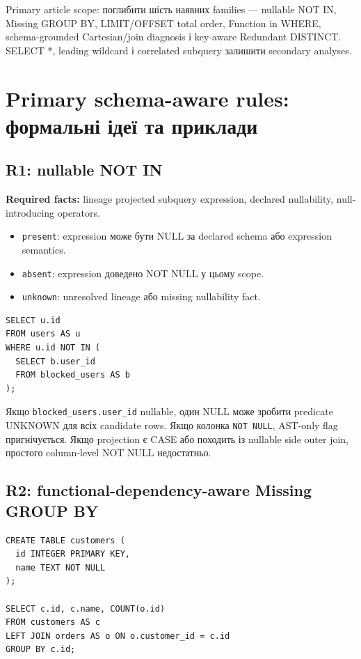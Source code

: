 \documentclass[11pt,a4paper]{article}
\newcommand{\unknown}{\texttt{unknown}}
\newcommand{\presentstate}{\texttt{present}}
\newcommand{\absentstate}{\texttt{absent}}
\begin{document}
\begin{mustbox}
Primary article scope: поглибити шість наявних families --- nullable NOT IN,
Missing GROUP BY, LIMIT/OFFSET total order, Function in WHERE, schema-grounded
Cartesian/join diagnosis і key-aware Redundant DISTINCT. SELECT *, leading wildcard
і correlated subquery залишити secondary analyses.
\end{mustbox}

\section{Primary schema-aware rules: формальні ідеї та приклади}

\subsection{R1: nullable NOT IN}

\textbf{Required facts:} lineage projected subquery expression, declared nullability,
null-introducing operators.

\begin{itemize}
\item \presentstate: expression може бути NULL за declared schema або expression
      semantics.
\item \absentstate: expression доведено NOT NULL у цьому scope.
\item \unknown: unresolved lineage або missing nullability fact.
\end{itemize}

\begin{lstlisting}[style=sqlstyle]
SELECT u.id
FROM users AS u
WHERE u.id NOT IN (
  SELECT b.user_id
  FROM blocked_users AS b
);
\end{lstlisting}

Якщо \texttt{blocked\_users.user\_id} nullable, один NULL може зробити predicate
UNKNOWN для всіх candidate rows. Якщо колонка \texttt{NOT NULL}, AST-only flag
пригнічується. Якщо projection є CASE або походить із nullable side outer join,
простого column-level NOT NULL недостатньо.

\subsection{R2: functional-dependency-aware Missing GROUP BY}

\begin{lstlisting}[style=sqlstyle]
CREATE TABLE customers (
  id INTEGER PRIMARY KEY,
  name TEXT NOT NULL
);

SELECT c.id, c.name, COUNT(o.id)
FROM customers AS c
LEFT JOIN orders AS o ON o.customer_id = c.id
GROUP BY c.id;
\end{lstlisting}
\end{document}
